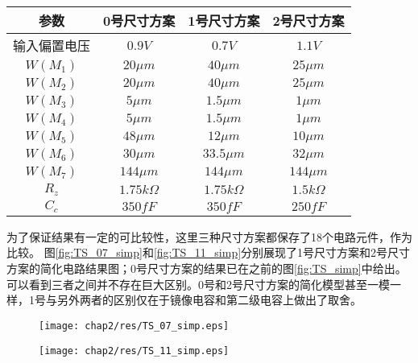 \begin{table}[!htbp]
	\centering
	\begin{tabular}{c|c|c|c}
		\hline
		        参数          &     0号尺寸方案     &     1号尺寸方案     &    2号尺寸方案     \\ \hline
		      输入偏置电压        &    $0.9 V$     &    $0.7 V$     &    $1.1 V$    \\
		$W\left(M_1\right)$ &   $20 \mu m$   &   $40 \mu m$   &  $25 \mu m$   \\
		$W\left(M_2\right)$ &   $20 \mu m$   &   $40 \mu m$   &  $25 \mu m$   \\
		$W\left(M_3\right)$ &   $5 \mu m$    &  $1.5 \mu m$   &   $1 \mu m$   \\
		$W\left(M_4\right)$ &   $5 \mu m$    &  $1.5 \mu m$   &   $1 \mu m$   \\
		$W\left(M_5\right)$ &   $48 \mu m$   &   $12 \mu m$   &  $10 \mu m$   \\
		$W\left(M_6\right)$ &   $30 \mu m$   &  $33.5 \mu m$  &  $32 \mu m$   \\
		$W\left(M_7\right)$ &  $144 \mu m$   &  $144 \mu m$   &  $144 \mu m$  \\
		       $R_z$        & $1.75 k\Omega$ & $1.75 k\Omega$ & $1.5 k\Omega$ \\
		       $C_c$        &    $350 fF$    &    $350 fF$    &   $250 fF$    \\ \hline
	\end{tabular}
\end{table}

为了保证结果有一定的可比较性，这里三种尺寸方案都保存了18个电路元件，作为比较。
图\ref{fig:TS_07_simp}和\ref{fig:TS_11_simp}分别展现了1号尺寸方案和2号尺寸方案的简化电路结果图；0号尺寸方案的结果已在之前的图\ref{fig:TS_simp}中给出。
可以看到三者之间并不存在巨大区别。0号和2号尺寸方案的简化模型甚至一模一样，1号与另外两者的区别仅在于镜像电容和第二级电容上做出了取舍。

\begin{figure}[!htp]
	\centering
	\texttt{[image: chap2/res/TS\_07\_simp.eps]}
\end{figure}

\begin{figure}[!htp]
	\centering
	\texttt{[image: chap2/res/TS\_11\_simp.eps]}
\end{figure}

